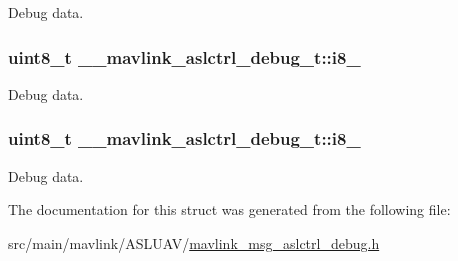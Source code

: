 Debug data. 

\hypertarget{struct____mavlink__aslctrl__debug__t_acc0bc2825b1055a3124b57d2bef65463}{
\subsubsection[{i8\+\_\+1}]{\setlength{\rightskip}{0pt plus 5cm}uint8\+\_\+t \+\_\+\+\_\+mavlink\+\_\+aslctrl\+\_\+debug\+\_\+t\+::i8\+\_}}\label{struct____mavlink__aslctrl__debug__t_acc0bc2825b1055a3124b57d2bef65463}


Debug data. 

\hypertarget{struct____mavlink__aslctrl__debug__t_a427da6303adbb1fc862a7013581e91f9}{
\subsubsection[{i8\+\_\+2}]{\setlength{\rightskip}{0pt plus 5cm}uint8\+\_\+t \+\_\+\+\_\+mavlink\+\_\+aslctrl\+\_\+debug\+\_\+t\+::i8\+\_}}\label{struct____mavlink__aslctrl__debug__t_a427da6303adbb1fc862a7013581e91f9}


Debug data. 



The documentation for this struct was generated from the following file\+:\begin{DoxyCompactItemize}
\item 
src/main/mavlink/\+A\+S\+L\+U\+A\+V/\hyperlink{mavlink__msg__aslctrl__debug_8h}{mavlink\+\_\+msg\+\_\+aslctrl\+\_\+debug.\+h}\end{DoxyCompactItemize}
